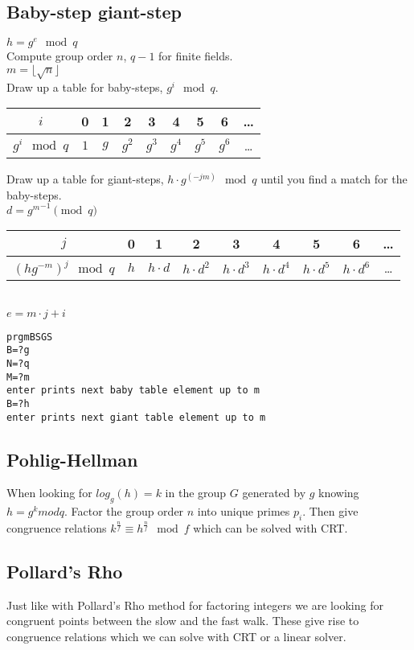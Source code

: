 \documentclass{article}
\begin{document}
\subsection{Baby-step giant-step}
$h = g^e \mod q$ \\
Compute group order $n$, $q-1$ for finite fields. \\
$m = \lfloor \sqrt{n} \rfloor$\\

Draw up a table for baby-steps, $g^i \mod q$.\\
\begin{tabular}{|c|c|c|c|c|c|c|c|c|}
\hline
$i $ & 0 & 1 & 2 & 3 & 4 & 5 & 6 & \ldots \\
\hline
$g^i \mod q$ & $1$ & $g$ & $g^2$ & $g^3$ & $g^4$ & $g^5$ & $g^6$ & \ldots \\
\hline
\end{tabular}

Draw up a table for giant-steps, $h \cdot g^(-jm) \mod q$ until you find a match for the baby-steps.\\
$d = {g^m}^{-1} \pmod{q}$\\
\begin{tabular}{|c|c|c|c|c|c|c|c|c|}
\hline
$j $ & 0 & 1 & 2 & 3 & 4 & 5 & 6 & \ldots \\
\hline
$(hg^{-m})^j \mod q$ & $h$ & $h \cdot d$ & $h \cdot d^2$ & $h \cdot d^3$ & $h \cdot d^4$ & $h \cdot d^5$ & $h \cdot d^6$ & \ldots \\
\hline
\end{tabular} \\
$e = m \cdot j + i$

\begin{verbatim}
prgmBSGS
B=?g
N=?q
M=?m
enter prints next baby table element up to m
B=?h
enter prints next giant table element up to m
\end{verbatim}


\subsection{Pohlig-Hellman}
When looking for $log_g(h) = k$ in the group $G$ generated by $g$ knowing $h = g^k mod q$.
Factor the group order $n$ into unique primes $p_i$.
Then give congruence relations $k^{\frac{n}{f}} \equiv h^{\frac{n}{f}} \mod f$
which can be solved with CRT.

\subsection{Pollard's Rho}
Just like with Pollard's Rho method for factoring integers we are looking for
congruent points between the slow and the fast walk. These give rise to congruence
relations which we can solve with CRT or a linear solver.
\end{document}
